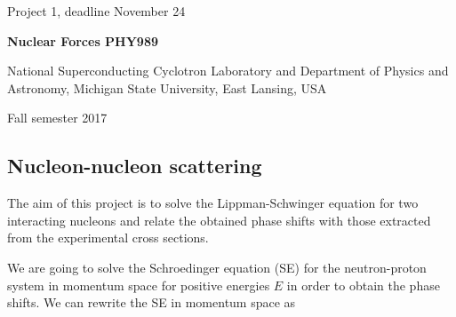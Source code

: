 \documentclass[%
oneside,                 %
final,                   %
10pt]{article}
\begin{document}

\newcommand{\exercisesection}[1]{\subsection*{#1}}






\thispagestyle{empty}

\begin{center}
{\LARGE\bf
\begin{spacing}{1.25}
Project 1, deadline  November 24
\end{spacing}
}
\end{center}


\begin{center}
{\bf Nuclear Forces PHY989}
\end{center}

    \begin{center}
\centerline{{\small National Superconducting Cyclotron Laboratory and Department of Physics and Astronomy, Michigan State University, East Lansing, USA}}
\end{center}
    

\begin{center}
Fall semester 2017
\end{center}

\vspace{1cm}


\subsection{Nucleon-nucleon scattering}

The aim of this project is to solve the Lippman-Schwinger equation for two interacting nucleons and relate the obtained phase shifts with those extracted from the experimental cross sections.

We are going to solve the Schroedinger equation (SE) 
for the neutron-proton system 
in momentum space for positive energies $E$ in order to obtain
the phase shifts. 
We can rewrite the SE 
in momentum space as
\end{document}
